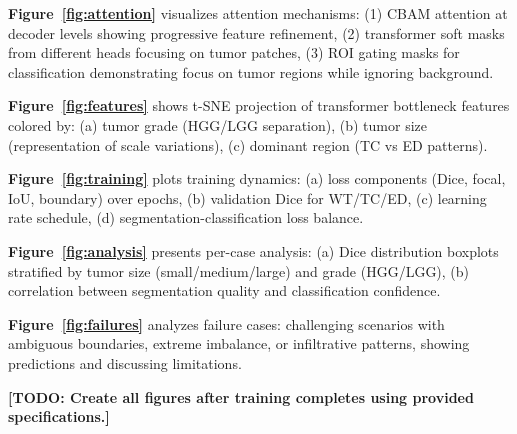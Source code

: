 \textbf{Figure~\ref{fig:attention}} visualizes attention mechanisms: (1) CBAM attention at decoder levels showing progressive feature refinement, (2) transformer soft masks from different heads focusing on tumor patches, (3) ROI gating masks for classification demonstrating focus on tumor regions while ignoring background.

\textbf{Figure~\ref{fig:features}} shows t-SNE projection of transformer bottleneck features colored by: (a) tumor grade (HGG/LGG separation), (b) tumor size (representation of scale variations), (c) dominant region (TC vs ED patterns).

\textbf{Figure~\ref{fig:training}} plots training dynamics: (a) loss components (Dice, focal, IoU, boundary) over epochs, (b) validation Dice for WT/TC/ED, (c) learning rate schedule, (d) segmentation-classification loss balance.

\textbf{Figure~\ref{fig:analysis}} presents per-case analysis: (a) Dice distribution boxplots stratified by tumor size (small/medium/large) and grade (HGG/LGG), (b) correlation between segmentation quality and classification confidence.

\textbf{Figure~\ref{fig:failures}} analyzes failure cases: challenging scenarios with ambiguous boundaries, extreme imbalance, or infiltrative patterns, showing predictions and discussing limitations.

\textbf{[TODO: Create all figures after training completes using provided specifications.]}
